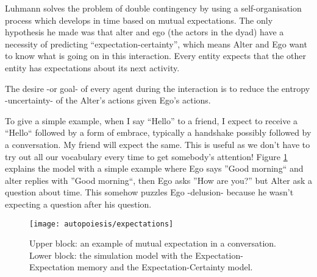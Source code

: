 Luhmann solves the problem of double contingency by using a self-organisation process which
develops in time based on mutual expectations.
The only hypothesis he made was that alter and ego (the actors in the dyad) have a
necessity of predicting ``expectation-certainty'', which means Alter and Ego want to know what
is going on in this interaction.
Every entity expects that the other entity has expectations about its next activity.

The desire -or goal- of every agent during the interaction is to reduce the entropy -uncertainty- of the
Alter's actions given Ego's actions.

To give a simple example, when I say ``Hello'' to a friend, I expect to receive a ``Hello`` followed by
a form of embrace, typically a handshake possibly followed by a conversation. My friend will expect the same.
This is useful as we don't have to try out all our vocabulary every time to get somebody's attention!
Figure \ref{Fig:Dittrich:Model} explains the model with a simple example where
Ego says ''Good morning`` and alter replies with ''Good morning``, then Ego
asks ''How are you?'' but Alter ask a question about time.
This somehow puzzles Ego -delusion- because he wasn't expecting a question after
his question.
\begin{figure}[htbp]
\begin{center}
\texttt{[image: autopoiesis/expectations]}
\end{center}
\small{
\caption[Expectations and communication structures]{
Upper block: an example of mutual expectation in a conversation.
Lower block: the simulation model with the Expectation-Expectation memory
and the Expectation-Certainty model.
\label{Fig:Dittrich:Model}}}
\end{figure}

